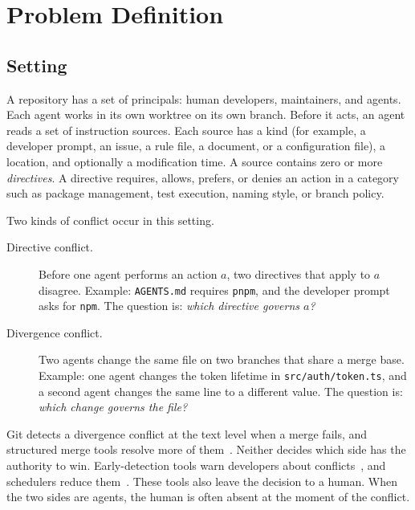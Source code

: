 \section{Problem Definition}
\label{sec:problem}

\subsection{Setting}
A repository has a set of principals: human developers, maintainers, and agents. Each agent works in its own worktree on its own branch. Before it acts, an agent reads a set of instruction sources. Each source has a kind (for example, a developer prompt, an issue, a rule file, a document, or a configuration file), a location, and optionally a modification time. A source contains zero or more \emph{directives}. A directive requires, allows, prefers, or denies an action in a category such as package management, test execution, naming style, or branch policy.

Two kinds of conflict occur in this setting.

\begin{description}
    \item[Directive conflict.] Before one agent performs an action $a$, two directives that apply to $a$ disagree. Example: \texttt{AGENTS.md} requires \texttt{pnpm}, and the developer prompt asks for \texttt{npm}. The question is: \emph{which directive governs $a$?}
    \item[Divergence conflict.] Two agents change the same file on two branches that share a merge base. Example: one agent changes the token lifetime in \texttt{src/auth/token.ts}, and a second agent changes the same line to a different value. The question is: \emph{which change governs the file?}
\end{description}

Git detects a divergence conflict at the text level when a merge fails, and structured merge tools resolve more of them~\cite{mens2002merging,apel2011semistructured}. Neither decides which side has the authority to win. Early-detection tools warn developers about conflicts~\cite{brun2011proactive,sarma2012palantir,guimaraes2012early}, and schedulers reduce them~\cite{kasi2013cassandra}. These tools also leave the decision to a human. When the two sides are agents, the human is often absent at the moment of the conflict.

